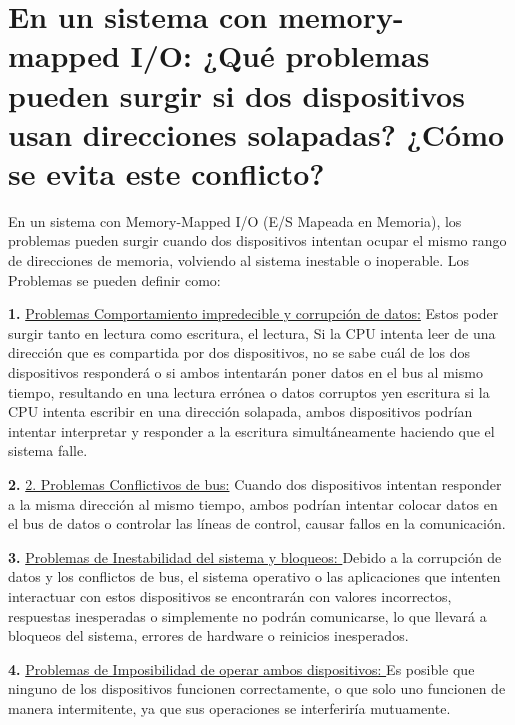 \documentclass{article}
\begin{document}
\quad
\newpage






\section{En un sistema con memory-mapped I/O: ¿Qué problemas pueden surgir si dos dispositivos usan direcciones solapadas? ¿Cómo se evita este conflicto?}


\quad

{En un sistema con Memory-Mapped I/O (E/S Mapeada en Memoria), los problemas pueden surgir cuando dos dispositivos intentan ocupar el mismo rango de direcciones de memoria, volviendo al sistema inestable o inoperable. Los Problemas se pueden definir como:}

\quad

\textbf{1.   } \underline{Problemas Comportamiento impredecible y corrupción de datos:}  {Estos poder surgir tanto en lectura como escritura, el lectura, Si la CPU intenta leer de una dirección que es compartida por dos dispositivos, no se sabe cuál de los dos dispositivos responderá o si ambos intentarán poner datos en el bus al mismo tiempo, resultando en una lectura errónea o datos corruptos yen escritura si la CPU intenta escribir en una dirección solapada, ambos dispositivos podrían intentar interpretar y responder a la escritura simultáneamente haciendo que el sistema falle.}

\quad

\textbf{2.   } \underline{2. Problemas Conflictivos de bus:}  {Cuando dos dispositivos intentan responder a la misma dirección al mismo tiempo, ambos podrían intentar colocar datos en el bus de datos o controlar las líneas de control, causar fallos en la comunicación.}

\quad

\textbf{3.   } \underline{Problemas de Inestabilidad del sistema y bloqueos: }  {Debido a la corrupción de datos y los conflictos de bus, el sistema operativo o las aplicaciones que intenten interactuar con estos dispositivos se encontrarán con valores incorrectos, respuestas inesperadas o simplemente no podrán comunicarse, lo que llevará a bloqueos del sistema, errores de hardware o reinicios inesperados.}

\quad


\textbf{4.   } \underline{Problemas de Imposibilidad de operar ambos dispositivos: }  {Es posible que ninguno de los dispositivos funcionen correctamente, o que solo uno funcionen de manera intermitente, ya que sus operaciones se interferiría mutuamente.}
\end{document}

